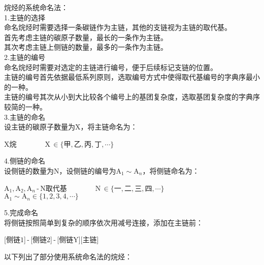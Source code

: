\documentclass[UTF8]{ctexart}
\begin{document}
    烷烃的系统命名法：\\[4mm]
    1.主链的选择\\[3mm]
    命名烷烃时需要选择一条碳链作为主链，其他的支链视为主链的取代基。\\[3mm]
    首先考虑主链的碳原子数量，最长的一条作为主链。\\[3mm]
    其次考虑主链上侧链的数量，最多的一条作为主链。\\[6mm]
    2.主链的编号\\[3mm]
    命名烷烃时需要对选定的主链进行编号，便于后续标记支链的位置。\\[3mm]
    主链的编号首先依据最低系列原则，选取编号方式中使得取代基编号的字典序最小的一种。\\[3mm]
    主链的编号其次从小到大比较各个编号上的基团复杂度，选取基团复杂度的字典序较简的一种。\\[6mm]
    3.主链的命名\\[3mm]
    设主链的碳原子数量为X，将主链命名为：
    \begin{center}
        X烷~~~~~~~~X\,$\in\big\{\text{甲},\text{乙},\text{丙},\text{丁},\cdots\big\}$
    \end{center}\vspace{10pt}
    4.侧链的命名\\[3mm]
    设侧链的数量为N，设侧链的编号为$\text{A}_1\sim \text{A}_n$，将侧链命名为：\vspace{2pt}
    \begin{center}
        $\text{A}_1,\text{A}_2,\text{A}_n$\,-\,N取代基~~~~~~~~N\,$\in\big\{\text{一},\text{二},\text{三},\text{四},\cdots\big\}$~~~~~~~~$\text{A}_1\sim \text{A}_n\in\big\{1,2,3,4,\cdots\big\}$
    \end{center}\vspace{15pt}
    5.完成命名\\[3mm]
    将侧链按照简单到复杂的顺序依次用减号连接，添加在主链前：
    \begin{center}
        [侧链$1$]\,-\,[侧链$2$]\,-\,[侧链Y][主链]
    \end{center}\vspace{25pt}
    以下列出了部分使用系统命名法的烷烃：\vspace{5pt}
    \begin{center}
        \qquad\quad
    \end{center}
    
\end{document}
